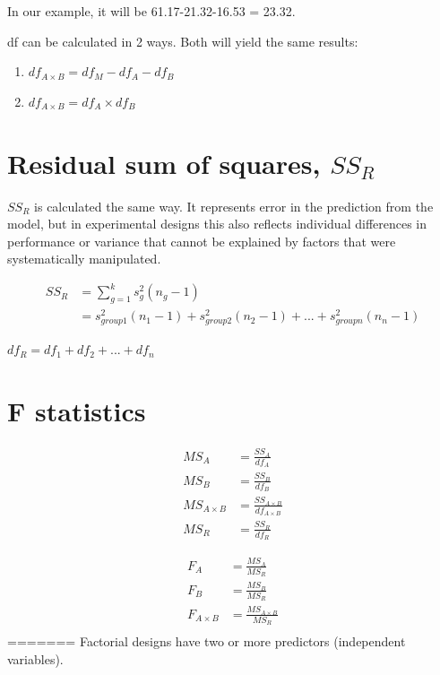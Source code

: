 In our example, it will be 61.17-21.32-16.53 = 23.32.

df can be calculated in 2 ways. Both will yield the same results:
\begin{enumerate}
\item $df_{A \times B} = df_M - df_A - df_B$
\item $df_{A \times B} = df_A \times df_B$
\end{enumerate}

\section{Residual sum of squares, $SS_R$}
$SS_R$ is calculated the same way. It represents error in the prediction from the model, but in experimental designs this also reflects individual differences in performance or variance that cannot be explained by factors that were systematically manipulated.

\begin{equation}
\begin{split}
SS_R & = \sum^k_{g=1} s^2_g (n_g - 1) \\
& = s^2_{group1}(n_1-1) + s^2_{group2}(n_2-1) + ... + s^2_{groupn}(n_n-1)
\end{split}
\end{equation}

$df_R = df_1 + df_2 + ... + df_n$

\section{F statistics}
\begin{equation}
\begin{split}
MS_A &= \frac{SS_A}{df_A}\\
MS_B &= \frac{SS_B}{df_B}\\
MS_{A \times B} &= \frac{SS_{A \times B}}{df_{A \times B}}\\
MS_R &= \frac{SS_R}{df_R}
\end{split}
\end{equation}

\begin{equation}
\begin{split}
F_A &= \frac{MS_A}{MS_R}\\
F_B &= \frac{MS_B}{MS_R}\\
F_{A \times B} &= \frac{MS_{A \times B}}{MS_R}\\
\end{split}
\end{equation}
=======
Factorial designs have two or more predictors (independent variables).

